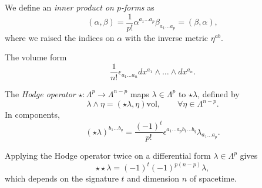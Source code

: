 \begin{definition}
  We define an \emph{inner product on $p$-forms} as
  \begin{equation}
    (\alpha, \beta) = \frac{1}{p!} \alpha^{a_1 \dots a_p} \beta_{a_1 \dots a_p} = (\beta, \alpha),
  \end{equation}
  where we raised the indices on $\alpha$ with the inverse metric $\eta^{ab}$.
\end{definition}
\begin{definition}
  The volume form
  \begin{equation}
    \frac{1}{n!} \epsilon_{a_1 \dots a_n} dx^{a_1} \wedge \dots \wedge d x^{a_n}.
  \end{equation}
\end{definition}

\begin{definition}
  The \emph{Hodge operator} $\star \colon \Lambda^p \to \Lambda^{n -p}$ maps $\lambda \in \Lambda^p$ to $\star \lambda$, defined by
  \begin{equation}
    \lambda \wedge \eta = (\star \lambda, \eta) \text{vol}, \qquad \forall \eta \in \Lambda^{n - p}.
  \end{equation}
  In components,
  \begin{equation}
    (\star \lambda)^{b_1 \dots b_q} = \frac{(-1)^{t}}{p!} \epsilon^{a_1 \dots a_p b_1 \dots b_q}  \lambda_{a_1 \dots a_p}.
  \end{equation}
\end{definition}
\begin{claim}
  Applying the Hodge operator twice on a differential form $\lambda \in \Lambda^p$ gives
  \begin{equation}
    \star \star \lambda = (-1)^t (-1)^{p (n - p)} \lambda,
  \end{equation}
  which depends on the signature $t$ and dimension $n$ of spacetime.
\end{claim}

